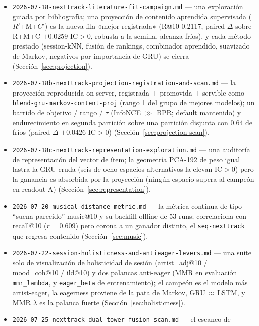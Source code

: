 \documentclass[11pt]{article}
\newcommand{\Rp}{\ensuremath{R'}}
\newcommand{\Cp}{\ensuremath{C'}}
\begin{document}
\begin{itemize}
    stacker aprendido, la LSTM es el mejor modelo individual, y R+M+C sobre
    PCA-192 se corona como la nueva fila «mejor registrada»
    (Sección~\ref{sec:phase2}).
  \item \texttt{2026-07-18-nexttrack-literature-fit-campaign.md} --- una exploración
    guiada por bibliografía; una proyección de contenido aprendida supervisada
    (\Rp+M+\Cp) es la nueva fila «mejor registrada» (R@10 \num{0.2117}, paired $\Delta$
    sobre R+M+C $+\num{0.0259}$ IC$>$0, robusta a la semilla, alcanza fríos), y cada
    método prestado (session-kNN, fusión de rankings, combinador aprendido, suavizado
    de Markov, negativos por importancia de GRU) se cierra (Sección~\ref{sec:projection}).
  \item \texttt{2026-07-18b-nexttrack-projection-registration-and-scan.md} --- la
    proyección reproducida on-server, registrada $+$ promovida $+$ servible como
    \texttt{blend-gru-markov-content-proj} (rango 1 del grupo de mejores modelos); un
    barrido de objetivo / rango / $\tau$ (InfoNCE $\gg$ BPR; default mantenido) y
    endurecimiento en segunda partición sobre una partición disjunta con 0.64 de fríos
    (paired $\Delta$ $+\num{0.0426}$ IC$>$0) (Sección~\ref{sec:projection-scan}).
  \item \texttt{2026-07-18c-nexttrack-representation-exploration.md} --- una auditoría
    de representación del vector de ítem; la geometría PCA-192 de peso igual lastra la
    GRU cruda (seis de ocho espacios alternativos la elevan IC$>$0) pero la ganancia es
    absorbida por la proyección (ningún espacio supera al campeón en readout A)
    (Sección~\ref{sec:representation}).
  \item \texttt{2026-07-20-musical-distance-metric.md} --- la métrica continua de tipo
    ``suena parecido'' music@10 y su backfill offline de 53 runs; correlaciona con
    recall@10 ($r=\num{0.609}$) pero corona a un ganador distinto, el
    \texttt{seq-nexttrack} que regresa contenido (Sección~\ref{sec:music}).
  \item \texttt{2026-07-22-session-holisticness-and-antieager-levers.md} ---
    una suite solo de visualización de holisticidad de sesión (artist\_adj@10 /
    mood\_coh@10 / ild@10) y dos palancas anti-eager (MMR en evaluación
    \texttt{mmr\_lambda}, y \texttt{eager\_beta} de entrenamiento); el campeón es el
    modelo más artist-eager, la eagerness proviene de la pata de Markov,
    GRU\,$\approx$\,LSTM, y MMR $\lambda$ es la palanca fuerte
    (Sección~\ref{sec:holisticness}).
  \item \texttt{2026-07-25-nexttrack-dual-tower-fusion-scan.md} --- el escaneo de

\end{itemize}
\end{document}
